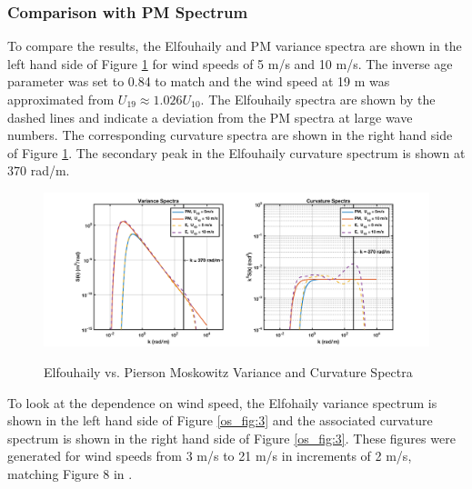 \subsubsection{Comparison with PM Spectrum}
To compare the results, the Elfouhaily and PM variance spectra are shown in the left hand side of Figure \ref{os_fig:2} for wind speeds of 5 m/s and 10 m/s. The inverse age parameter was set to 0.84 to match and the wind speed at 19 m was approximated from $U_{19} \approx 1.026 U_{10}$. The Elfouhaily spectra are shown by the dashed lines and indicate a deviation from the PM spectra at large wave numbers. The corresponding curvature spectra are shown in the right hand side of Figure \ref{os_fig:2}. The secondary peak in the Elfouhaily curvature spectrum is shown at 370 rad/m.
\begin{figure}[H]
  \begin{center}
\includegraphics[width=6in]{../media/Ocean_Surface/elf_vs_PM_variance_curvature_spectrum.png}
  \end{center}
  \renewcommand{\baselinestretch}{1} \small\normalsize
  \begin{quote}
    \caption[Elfouhaily vs. Pierson Moskowitz Variance and Curvature Spectra]{Elfouhaily vs. Pierson Moskowitz Variance and Curvature Spectra\label{os_fig:2}}
  \end{quote}
\end{figure}
\renewcommand{\baselinestretch}{2} \small\normalsize
To look at the dependence on wind speed, the Elfohaily variance spectrum is shown in the left hand side of Figure \ref{os_fig:3} and the associated curvature spectrum is shown in the right hand side of Figure \ref{os_fig:3}. These figures were generated for wind speeds from 3 m/s to 21 m/s in increments of 2 m/s, matching Figure 8 in \cite{elfouhaily}.
